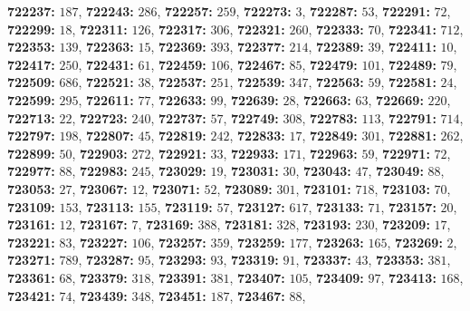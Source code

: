 \textsf{\bfseries 722237:} $187$, \textsf{\bfseries 722243:} $286$, \textsf{\bfseries 722257:} $259$, \textsf{\bfseries 722273:} $3$, \textsf{\bfseries 722287:} $53$, \textsf{\bfseries 722291:} $72$, \textsf{\bfseries 722299:} $18$, \textsf{\bfseries 722311:} $126$, \textsf{\bfseries 722317:} $306$, \textsf{\bfseries 722321:} $260$, \textsf{\bfseries 722333:} $70$, \textsf{\bfseries 722341:} $712$, \textsf{\bfseries 722353:} $139$, \textsf{\bfseries 722363:} $15$, \textsf{\bfseries 722369:} $393$, \textsf{\bfseries 722377:} $214$, \textsf{\bfseries 722389:} $39$, \textsf{\bfseries 722411:} $10$, \textsf{\bfseries 722417:} $250$, \textsf{\bfseries 722431:} $61$, \textsf{\bfseries 722459:} $106$, \textsf{\bfseries 722467:} $85$, \textsf{\bfseries 722479:} $101$, \textsf{\bfseries 722489:} $79$, \textsf{\bfseries 722509:} $686$, \textsf{\bfseries 722521:} $38$, \textsf{\bfseries 722537:} $251$, \textsf{\bfseries 722539:} $347$, \textsf{\bfseries 722563:} $59$, \textsf{\bfseries 722581:} $24$, \textsf{\bfseries 722599:} $295$, \textsf{\bfseries 722611:} $77$, \textsf{\bfseries 722633:} $99$, \textsf{\bfseries 722639:} $28$, \textsf{\bfseries 722663:} $63$, \textsf{\bfseries 722669:} $220$, \textsf{\bfseries 722713:} $22$, \textsf{\bfseries 722723:} $240$, \textsf{\bfseries 722737:} $57$, \textsf{\bfseries 722749:} $308$, \textsf{\bfseries 722783:} $113$, \textsf{\bfseries 722791:} $714$, \textsf{\bfseries 722797:} $198$, \textsf{\bfseries 722807:} $45$, \textsf{\bfseries 722819:} $242$, \textsf{\bfseries 722833:} $17$, \textsf{\bfseries 722849:} $301$, \textsf{\bfseries 722881:} $262$, \textsf{\bfseries 722899:} $50$, \textsf{\bfseries 722903:} $272$, \textsf{\bfseries 722921:} $33$, \textsf{\bfseries 722933:} $171$, \textsf{\bfseries 722963:} $59$, \textsf{\bfseries 722971:} $72$, \textsf{\bfseries 722977:} $88$, \textsf{\bfseries 722983:} $245$, \textsf{\bfseries 723029:} $19$, \textsf{\bfseries 723031:} $30$, \textsf{\bfseries 723043:} $47$, \textsf{\bfseries 723049:} $88$, \textsf{\bfseries 723053:} $27$, \textsf{\bfseries 723067:} $12$, \textsf{\bfseries 723071:} $52$, \textsf{\bfseries 723089:} $301$, \textsf{\bfseries 723101:} $718$, \textsf{\bfseries 723103:} $70$, \textsf{\bfseries 723109:} $153$, \textsf{\bfseries 723113:} $155$, \textsf{\bfseries 723119:} $57$, \textsf{\bfseries 723127:} $617$, \textsf{\bfseries 723133:} $71$, \textsf{\bfseries 723157:} $20$, \textsf{\bfseries 723161:} $12$, \textsf{\bfseries 723167:} $7$, \textsf{\bfseries 723169:} $388$, \textsf{\bfseries 723181:} $328$, \textsf{\bfseries 723193:} $230$, \textsf{\bfseries 723209:} $17$, \textsf{\bfseries 723221:} $83$, \textsf{\bfseries 723227:} $106$, \textsf{\bfseries 723257:} $359$, \textsf{\bfseries 723259:} $177$, \textsf{\bfseries 723263:} $165$, \textsf{\bfseries 723269:} $2$, \textsf{\bfseries 723271:} $789$, \textsf{\bfseries 723287:} $95$, \textsf{\bfseries 723293:} $93$, \textsf{\bfseries 723319:} $91$, \textsf{\bfseries 723337:} $43$, \textsf{\bfseries 723353:} $381$, \textsf{\bfseries 723361:} $68$, \textsf{\bfseries 723379:} $318$, \textsf{\bfseries 723391:} $381$, \textsf{\bfseries 723407:} $105$, \textsf{\bfseries 723409:} $97$, \textsf{\bfseries 723413:} $168$, \textsf{\bfseries 723421:} $74$, \textsf{\bfseries 723439:} $348$, \textsf{\bfseries 723451:} $187$, \textsf{\bfseries 723467:} $88$, 
